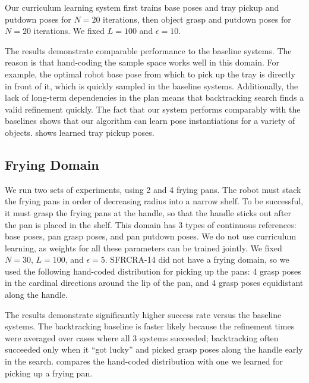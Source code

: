 Our curriculum learning system first trains base poses and tray pickup and putdown poses for
$N = 20$ iterations, then object grasp and putdown poses for $N = 20$ iterations. We fixed $L = 100$ and $\epsilon = 10$.

The results demonstrate comparable performance to the baseline systems. The reason is that
hand-coding the sample space works well in this domain. For example, the optimal
robot base pose from which to pick up the tray is directly in front of it, which is quickly sampled in
the baseline systems. Additionally, the lack of long-term dependencies in the plan
means that backtracking search finds a valid refinement quickly. The fact that our system performs comparably
with the baselines shows that our algorithm can learn pose instantiations for a variety of objects.
 shows learned tray pickup poses.

\subsection{Frying Domain}
We run two sets of experiments, using 2 and 4 frying pans. The robot must stack the frying pans in order of decreasing
radius into a narrow shelf. To be successful, it must grasp the frying pans at the handle, so that the handle sticks out
after the pan is placed in the shelf. This domain has 3 types of continuous references: base poses, pan grasp poses, and
pan putdown poses. We do not use curriculum learning, as weights for all these parameters can be trained jointly.
We fixed $N = 30$, $L = 100$, and $\epsilon = 5$. SFRCRA-14 did not have a frying domain, so we used the following
hand-coded distribution for picking up the pans: 4 grasp poses in the cardinal directions around the lip of the pan,
and 4 grasp poses equidistant along the handle.

The results demonstrate significantly higher success rate versus the baseline systems. The backtracking baseline is faster likely because
the refinement times were averaged over cases where all 3 systems succeeded; backtracking often succeeded only when
it ``got lucky'' and picked grasp poses along the handle early in the search.  compares the hand-coded
distribution with one we learned for picking up a frying pan.